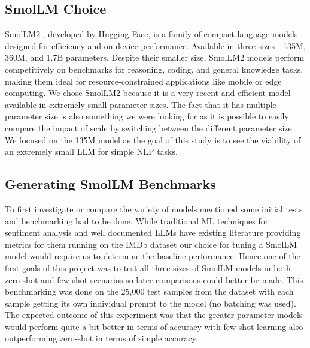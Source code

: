 \documentclass[10pt,twocolumn,letterpaper]{article}
\begin{document}
\subsection{SmolLM Choice}
SmolLM2 \cite{hf-smollm-usecase}, developed by Hugging Face, is a family of compact language models designed for efficiency and on-device performance. Available in three sizes—135M, 360M, and 1.7B parameters. Despite their smaller size, SmolLM2 models perform competitively on benchmarks for reasoning, coding, and general knowledge tasks, making them ideal for resource-constrained applications like mobile or edge computing.
We chose SmolLM2 because it is a very recent and efficient model available in extremely small parameter sizes. The fact that it has multiple parameter size is also something we were looking for as it is possible to easily compare the impact of scale by switching between the different parameter size. We focused on the 135M model as the goal of this study is to see the viability of an extremely small LLM for simple NLP tasks. 




\subsection{Generating SmolLM Benchmarks}
To first investigate or compare the variety of models mentioned some initial tests and benchmarking had to be done. While traditional ML techniques for sentiment analysis and well documented LLMs have existing literature providing metrics for them running on the IMDb dataset \cite{IMDB-dataset} our choice for tuning a SmolLM model would require us to determine the baseline performance. Hence one of the first goals of this project was to test all three sizes of SmolLM models in both zero-shot and few-shot scenarios so later comparisons could better be made. This benchmarking was done on the 25,000 test samples from the dataset with each sample getting its own individual prompt to the model (no batching was used). The expected outcome of this experiment was that the greater parameter models would perform quite a bit better in terms of accuracy with few-shot learning also outperforming zero-shot in terms of simple accuracy. 
\end{document}
